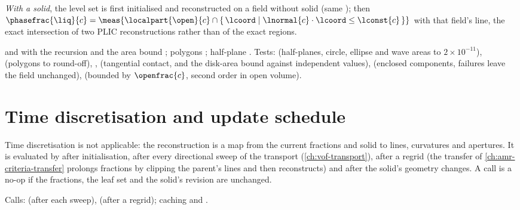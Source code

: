 \emph{With a solid}, the level set is first initialised and reconstructed on a
field without solid (same ); then
$\phasefrac{\liq}{c}=\meas{\localpart{\open}{c}\cap\set{\lcoord}{\lnormal{c}\cdot\lcoord\le\lconst{c}}}$
with that field's line, the exact intersection of two PLIC reconstructions
rather than of the exact regions.

\begin{implnote}
 and 
with the recursion 
and the area bound ;
polygons ; half-plane
. Tests:
(half-planes, circle, ellipse and wave areas to $2\times10^{-11}$),
(polygons to round-off),
,
(tangential contact, and the disk-area bound against independent values),
(enclosed components, failures leave the field unchanged),
(bounded by $\openfrac{c}$, second order in open volume).
\end{implnote}

\section{Time discretisation and update schedule}\label{sec:interface:time}
Time discretisation is not applicable: the reconstruction is a map from the
current fractions and solid to lines, curvatures and apertures. It is
evaluated by  after initialisation, after every
directional sweep of the transport (\cref{ch:vof-transport}), after a regrid
(the transfer of \cref{ch:amr-criteria-transfer} prolongs fractions by
clipping the parent's lines and then reconstructs) and after the solid's
geometry changes. A call is a no-op if the fractions, the leaf set and the
solid's revision are unchanged.

\begin{implnote}
Calls:  (after each sweep),
 (after a
regrid); caching 
and .
\end{implnote}
